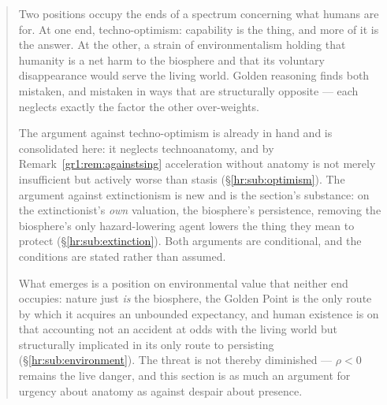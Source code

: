 \documentclass[11pt]{article}
\numberwithin{equation}{section}
\theoremstyle{plain}
\theoremstyle{definition}
\theoremstyle{remark}
\begin{document}
\begin{quote}\small
Two positions occupy the ends of a spectrum concerning what humans are
for. At one end, techno-optimism: capability is the thing, and more of
it is the answer. At the other, a strain of environmentalism holding
that humanity is a net harm to the biosphere and that its voluntary
disappearance would serve the living world. Golden reasoning finds both
mistaken, and mistaken in ways that are structurally opposite --- each
neglects exactly the factor the other over-weights.

The argument against techno-optimism is already in hand and is
consolidated here: it neglects technoanatomy, and by
Remark~\ref{gr1:rem:againstsing} acceleration without anatomy is not
merely insufficient but actively worse than stasis
(\S\ref{hr:sub:optimism}). The argument against extinctionism is new and
is the section's substance: on the extinctionist's \emph{own} valuation, the biosphere's persistence, removing the biosphere's only
hazard-lowering agent lowers the thing they mean to protect
(\S\ref{hr:sub:extinction}). Both arguments are conditional, and the
conditions are stated rather than assumed.

What emerges is a position on environmental value that neither end
occupies: nature just \emph{is} the biosphere, the Golden Point is the
only route by which it acquires an unbounded expectancy, and human
existence is on that accounting not an accident at odds with the living
world but structurally implicated in its only route to persisting
(\S\ref{hr:sub:environment}). The threat is not thereby diminished ---
$\rho<0$ remains the live danger, and this section is as much an
argument for urgency about anatomy as against despair about presence.
\end{quote}
\end{document}
